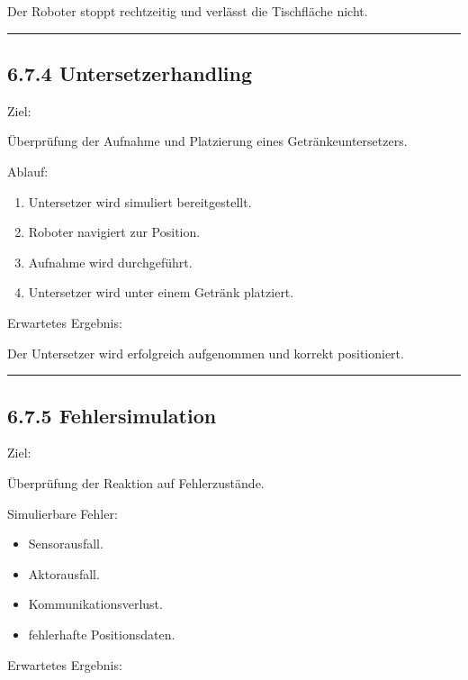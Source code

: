 \documentclass[
  a4paper,
  12pt,
  DIV=12,        %
  parskip=half,  %
  headings=small %
]{scrartcl}
\theoremstyle{definition}
\providecommand{\tightlist}{%
  \setlength{\itemsep}{0pt}\setlength{\parskip}{0pt}}
\theoremstyle{definition}
\providecommand{\tightlist}{%
  \setlength{\itemsep}{0pt}\setlength{\parskip}{0pt}}
\begin{document}
Der Roboter stoppt rechtzeitig und verlässt die Tischfläche nicht.

\begin{center}\rule{0.5\linewidth}{0.5pt}\end{center}

\subsection{6.7.4 Untersetzerhandling}\label{untersetzerhandling-2}

Ziel:

Überprüfung der Aufnahme und Platzierung eines Getränkeuntersetzers.

Ablauf:

\begin{enumerate}
\def\labelenumi{\arabic{enumi}.}
\tightlist
\item
  Untersetzer wird simuliert bereitgestellt.
\item
  Roboter navigiert zur Position.
\item
  Aufnahme wird durchgeführt.
\item
  Untersetzer wird unter einem Getränk platziert.
\end{enumerate}

Erwartetes Ergebnis:

Der Untersetzer wird erfolgreich aufgenommen und korrekt positioniert.

\begin{center}\rule{0.5\linewidth}{0.5pt}\end{center}

\subsection{6.7.5 Fehlersimulation}\label{fehlersimulation}

Ziel:

Überprüfung der Reaktion auf Fehlerzustände.

Simulierbare Fehler:

\begin{itemize}
\tightlist
\item
  Sensorausfall.
\item
  Aktorausfall.
\item
  Kommunikationsverlust.
\item
  fehlerhafte Positionsdaten.
\end{itemize}

Erwartetes Ergebnis:
\end{document}

